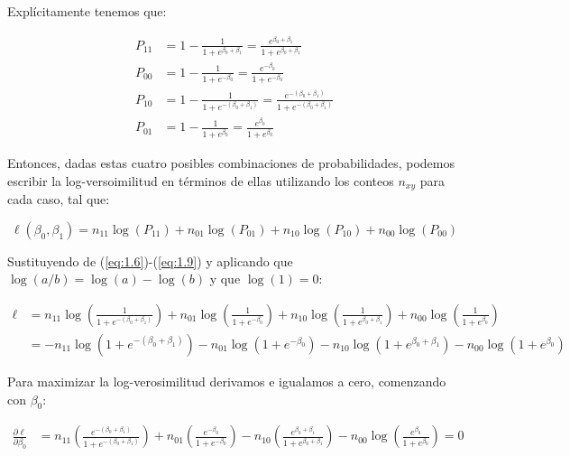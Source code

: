Explícitamente tenemos que:

\begin{align*}
    P_{11} &= 1 - \frac{1}{1+e^{\beta_0 + \beta_1}} = \frac{e^{\beta_0+\beta_1}}{1+e^{\beta_0+\beta_1}} \\[0.1cm]
    P_{00} &= 1 - \frac{1}{1 + e^{-\beta_0}} = \frac{e^{-\beta_0}}{1+e^{-\beta_0}} \\[0.1cm]
    P_{10} &= 1 - \frac{1}{1 + e^{-(\beta_0 + \beta_1)}} = \frac{e^{-(\beta_0+\beta_1)}}{1+e^{-(\beta_0+\beta_1)}} \\[0.1cm]
    P_{01} &= 1 - \frac{1}{1+e^{\beta_0}} = \frac{e^{\beta_0}}{1+e^{\beta_0}}
\end{align*}

Entonces, dadas estas cuatro posibles combinaciones de probabilidades, podemos escribir la log-versoimilitud en términos de ellas utilizando los conteos $n_{xy}$ para cada caso, tal que:

\begin{equation}
    \ell(\beta_0,\beta_1) = n_{11} \log(P_{11}) + n_{01} \log(P_{01}) + n_{10} \log(P_{10}) + n_{00} \log(P_{00})
    \label{eq:1.14}
\end{equation}

Sustituyendo de (\ref{eq:1.6})-(\ref{eq:1.9}) y aplicando que $\log(a/b)=\log(a)-\log(b)$ y que $\log(1)=0$:

\begin{align*}
    \ell &= n_{11} \log \left(\frac{1}{1 + e^{-(\beta_0 + \beta_1)}}\right) + n_{01} \log \left(\frac{1}{1 + e^{-\beta_0}}\right) + n_{10} \log \left(\frac{1}{1+e^{\beta_0 + \beta_1}}\right) + n_{00} \log \left(\frac{1}{1+e^{\beta_0}}\right) \\[0.1cm]
    &= -n_{11} \log\left(1 + e^{-(\beta_0 + \beta_1)}\right) - n_{01} \log \left(1 + e^{-\beta_0}\right) - n_{10} \log \left({1+e^{\beta_0 + \beta_1}}\right) - n_{00} \log \left({1+e^{\beta_0}}\right)
\end{align*}

Para maximizar la log-verosimilitud derivamos e igualamos a cero, comenzando con $\beta_0$:

\begin{align*}
    \frac{\partial\ell}{\partial\beta_0} &=  n_{11} \left(\frac{e^{-(\beta_0+\beta_1)}}{1 + e^{-(\beta_0 + \beta_1)}}\right) + n_{01} \left(\frac{e^{-\beta_0}}{1 + e^{-\beta_0}}\right) - n_{10} \left(\frac{e^{\beta_0 + \beta_1}}{1 + e^{\beta_0 + \beta_1}}\right) - n_{00} \log \left(\frac{e^{\beta_0}}{1 + e^{\beta_0}}\right) = 0
\end{align*}

